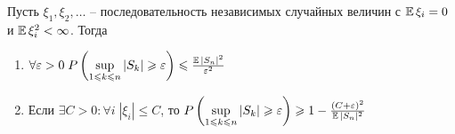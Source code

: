 \begin{lemma}
Пусть \( \xi_1, \xi_2, \ldots \) -- последовательность независимых случайных величин с
\( \operatorname{\mathbb{E}} \xi_i = 0 \) и \( \operatorname{\mathbb{E}} \xi_i^2 < \infty \). Тогда 
\begin{enumerate}
    \item 
    \( \forall \varepsilon > 0 \; 
    P \left( \sup \limits_{1 \leqslant k \leqslant n} |S_k| 
    \geqslant \varepsilon \right) \leqslant
    \frac{\operatorname{\mathbb{E}} |S_n|^2}{\varepsilon^2}
    \) 
    \item 
    Если \( \exists C > 0 : \forall i \; |\xi_i| \leqslant C \), то
    \( P \left( \sup \limits_{1 \leqslant k \leqslant n} |S_k| 
    \geqslant \varepsilon \right) \geqslant 
    1 - \frac{(C + \varepsilon)^2}{\operatorname{\mathbb{E}} |S_n|^2} \)
\end{enumerate}
\end{lemma}
